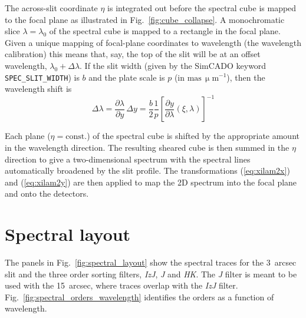 \documentclass[a4paper,twoside,11pt]{article}
\newcommand{\micron}{\upmu\mathrm{m}}
\begin{document}
The across-slit coordinate $\eta$ is integrated out before the
spectral cube is mapped to the focal plane as illustrated in
Fig.~\ref{fig:cube_collapse}. A monochromatic slice
$\lambda=\lambda_{0}$ of the spectral cube is mapped to a rectangle in
the focal plane. Given a unique mapping of focal-plane coordinates to
wavelength (the wavelength calibration) this means that, say, the top
of the slit will be at an offset wavelength,
$\lambda_{0}+\Delta\lambda$. If the slit width (given by the SimCADO
keyword \lstinline{SPEC_SLIT_WIDTH}) is $b$ and the plate scale is $p$
(in $\mathrm{mas}\,\micron^{-1}$), then the wavelength shift is
\begin{equation}
  \Delta\lambda = \frac{\partial\lambda}{\partial y}\,\Delta y
  = \frac{b}{2}\frac{1}{p} \left[\frac{\partial y}{\partial
      \lambda}(\xi, \lambda)\right]^{-1}
\end{equation}

Each plane ($\eta = \mathrm{const.}$) of the spectral cube is shifted
by the appropriate amount in the wavelength direction. The resulting
sheared cube is then summed in the $\eta$ direction to give a
two-dimensional spectrum with the spectral lines automatically
broadened by the slit profile. The transformations (\ref{eq:xilam2x})
and (\ref{eq:xilam2y}) are then applied to map the 2D spectrum into
the focal plane and onto the detectors.


\section{Spectral layout}
\label{sec:spectral_layout}

The panels in Fig.~\ref{fig:spectral_layout} show the spectral traces
for the 3~arcsec slit and the three order sorting filters,
\textit{IzJ}, \textit{J} and \textit{HK}. The \textit{J} filter is
meant to be used with the 15~arcsec, where traces overlap with the
\textit{IzJ} filter. Fig.~\ref{fig:spectral_orders_wavelength}
identifies the orders as a function of wavelength.
\end{document}
